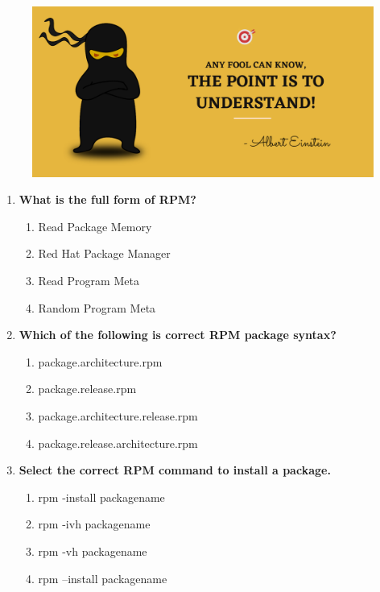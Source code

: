 \setlength{\columnsep}{3pt}
\begin{flushleft}
	
	\paragraph{}
	\bigskip
	
	\begin{figure}[h!]
		\centering
		\includegraphics[scale=.2]{content/practise.jpg}
	\end{figure}	
	\begin{enumerate}
		
		\item \textbf{What is the full form of RPM?}
		\begin{enumerate}[label=(\alph*)]
			\item Read Package Memory
			\item Red Hat Package Manager %
			\item Read Program Meta
			\item Random Program Meta
		\end{enumerate}
		\bigskip
		\bigskip
		
		\item \textbf{Which of the following is correct RPM package syntax?}
		\begin{enumerate}[label=(\alph*)]
			\item package.architecture.rpm
			\item package.release.rpm
			\item package.architecture.release.rpm 
			\item package.release.architecture.rpm   %
		\end{enumerate}
		\bigskip
		\bigskip	
		
		\item \textbf{Select the correct RPM command to install a package.}
		\begin{enumerate}[label=(\alph*)]
			\item rpm -install packagename
			\item rpm -ivh packagename  %
			\item rpm -vh packagename
			\item rpm --install packagename
		\end{enumerate}
		\bigskip
		\bigskip	


\end{enumerate}
\end{flushleft}
